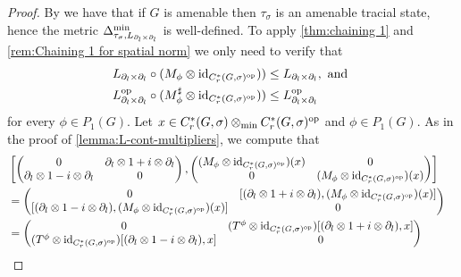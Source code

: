 \documentclass[11pt, a4paper, oneside, final, reqno]{amsart}
\newcommand{\id}{\operatorname{id}}
\newcommand{\Cred}{C^*_r}
\theoremstyle{definition}
\theoremstyle{plain}
\theoremstyle{remark}
\numberwithin{equation}{section}
\begin{document}
\begin{proof}
    By \cite[Corollary 3.8]{Bedos1995} we have that if $G$ is amenable then $\tau_{\sigma}$ is an amenable tracial state, hence the metric $\Delta_{\tau_\sigma,L_{\partial_l \times \partial_l}}^{\rm min}$ is well-defined. To apply \cref{thm:chaining 1} and \cref{rem:Chaining 1 for spatial norm} we only need to verify that
    \begin{align*}
        L_{\partial_l \times \partial_l} \circ (M_\phi \otimes \id_{\Cred(G,\sigma)^{\rm op}})) & \leq L_{\partial_l \times \partial_l}, \text{ and } \\
        L_{\partial_l \times \partial_l}^{\rm op} \circ (M_\phi^\sharp \otimes \id_{\Cred(G,\sigma)^{\rm op}})) & \leq L_{\partial_l \times \partial_l}^{\rm op}
    \end{align*}
    for every $\phi \in P_1(G)$. Let $x \in \Cred(G,\sigma) \otimes_{\rm min} \Cred(G,\sigma)^{\rm op}$ and $\phi \in P_1(G)$. As in the proof of \cref{lemma:L-cont-multipliers}, we compute that
    \begin{align*}
        & \left[
        \begin{pmatrix}
            0 & \partial_l \otimes 1 + i \otimes \partial_l \\
            \partial_l \otimes 1 - i \otimes \partial_l & 0
        \end{pmatrix},
        \begin{pmatrix}
            (M_\phi \otimes \id_{\Cred(G,\sigma)^{\rm op}})(x) & 0 \\
            0 & (M_\phi \otimes \id_{\Cred(G,\sigma)^{\rm op}})(x)
        \end{pmatrix}
        \right] & \\
        & =
        \begin{pmatrix}
            0 & [(\partial_l \otimes 1 + i \otimes \partial_l), (M_\phi \otimes \id_{\Cred(G,\sigma)^{\rm op}})(x)] \\
            [(\partial_l \otimes 1 - i \otimes \partial_l), (M_\phi \otimes \id_{\Cred(G,\sigma)^{\rm op}})(x)] & 0
        \end{pmatrix} & \\
        & =
        \begin{pmatrix}
            0 & (T^\phi \otimes \id_{\Cred(G,\sigma)^{\rm op}})[(\partial_l \otimes 1 + i \otimes \partial_l), x] \\
            (T^\phi \otimes \id_{\Cred(G,\sigma)^{\rm op}})[(\partial_l \otimes 1 - i \otimes \partial_l), x] & 0
        \end{pmatrix} \\

\end{align*}
\end{proof}
\end{document}
